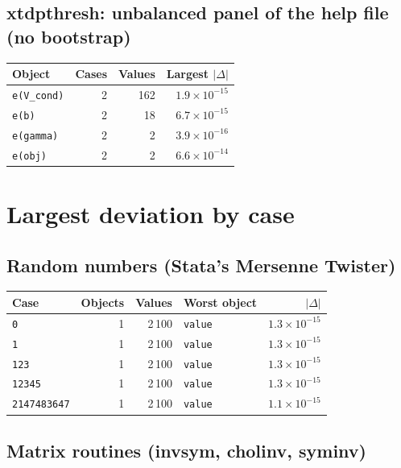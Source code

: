 \documentclass[10.5pt,a4paper]{article}
\begin{document}
\subsection*{xtdpthresh: unbalanced panel of the help file (no bootstrap)}

\begin{longtable}{@{}p{8.2cm}rrr@{}}
\toprule
Object & Cases & Values & Largest $|\Delta|$ \\
\midrule
\endhead
\texttt{e(V\_\allowbreak{}cond)} & 2 & 162 & $1.9\times10^{-15}$ \\
\texttt{e(b)} & 2 & 18 & $6.7\times10^{-15}$ \\
\texttt{e(gamma)} & 2 & 2 & $3.9\times10^{-16}$ \\
\texttt{e(obj)} & 2 & 2 & $6.6\times10^{-14}$ \\
\bottomrule
\end{longtable}

\section{Largest deviation by case}

\subsection*{Random numbers (Stata's Mersenne Twister)}

\begin{longtable}{@{}p{3.6cm}rrp{4.9cm}r@{}}
\toprule
Case & Objects & Values & Worst object & $|\Delta|$ \\
\midrule
\endhead
\texttt{0} & 1 & 2\,100 & \texttt{value} & $1.3\times10^{-15}$ \\
\texttt{1} & 1 & 2\,100 & \texttt{value} & $1.3\times10^{-15}$ \\
\texttt{123} & 1 & 2\,100 & \texttt{value} & $1.3\times10^{-15}$ \\
\texttt{12345} & 1 & 2\,100 & \texttt{value} & $1.3\times10^{-15}$ \\
\texttt{2147483647} & 1 & 2\,100 & \texttt{value} & $1.1\times10^{-15}$ \\
\bottomrule
\end{longtable}

\subsection*{Matrix routines (invsym, cholinv, syminv)}
\end{document}
